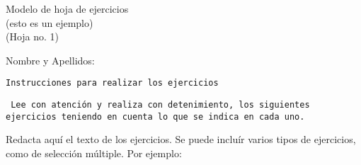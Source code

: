 \documentclass[letterpaper,12pt,notitlepage,spanish]{article}
\begin{document}
%
%
\begin{center}
%
\Large{ %
Modelo de hoja de ejercicios \\ (esto es un ejemplo) 
} \\
\vspace*{0.5cm}
\normalsize %
(Hoja no. 1)
\\
\vspace{1.10cm}
	\begin{flushleft}
	Nombre y Apellidos: \hrulefill\\
	\vspace*{0.50cm}
		\begin{center}
		\small{\texttt{Instrucciones para realizar los ejercicios}
		}\\		
		\end{center}
	\vspace*{0.5cm}
%
\small{ %
\texttt{
Lee con atención y realiza con detenimiento, los siguientes ejercicios teniendo en cuenta lo que se indica en cada uno. \\
}} %
%
	\vspace*{0.75cm}		
 	\end{flushleft}
\end{center}
%
\begin{ejercicio}[] %
Redacta aquí el texto de los ejercicios. Se puede incluír varios tipos de ejercicios, como de selección múltiple. 
Por ejemplo:
\end{ejercicio} %
%
%
\end{document}
